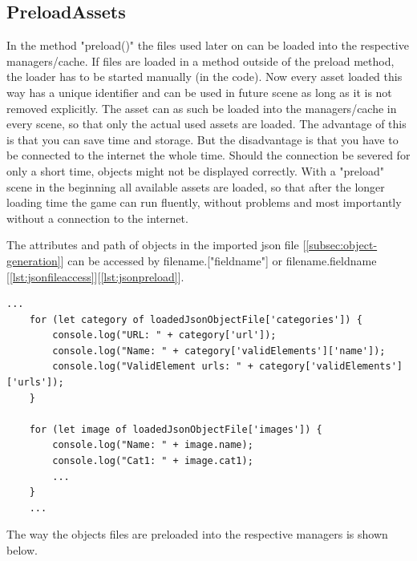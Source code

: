\subsection{PreloadAssets}\label{subsec:preloadassets}
In the method "preload()" the files used later on can be loaded into the respective managers/cache.
If files are loaded in a method outside of the preload method, the loader has to be started manually (in the code).
Now every asset loaded this way has a unique identifier and can be used in future scene
as long as it is not removed explicitly.
The asset can as such be loaded into the managers/cache in every scene,
so that only the actual used assets are loaded.
The advantage of this is that you can save time and storage.
But the disadvantage is that you have to be connected to the internet the whole time.
Should the connection be severed for only a short time, objects might not be displayed correctly.
With a "preload" scene in the beginning all available assets are loaded,
so that after the longer loading time the game can run fluently,
without problems and most importantly without a connection to the internet.

The attributes and path of objects in the imported json file [\ref{subsec:object-generation}]
can be accessed by filename.["fieldname"] or filename.fieldname [\ref{lst:jsonfileaccess}][\ref{lst:jsonpreload}].

\begin{lstlisting}[style=TypeScript, caption={Example json file access}, label={lst:jsonfileaccess}]
    ...
    for (let category of loadedJsonObjectFile['categories']) {
        console.log("URL: " + category['url']);
        console.log("Name: " + category['validElements']['name']);
        console.log("ValidElement urls: " + category['validElements']['urls']);
    }

    for (let image of loadedJsonObjectFile['images']) {
        console.log("Name: " + image.name);
        console.log("Cat1: " + image.cat1);
        ...
    }
    ...
\end{lstlisting}

The way the objects files are preloaded into the respective managers is shown below.

